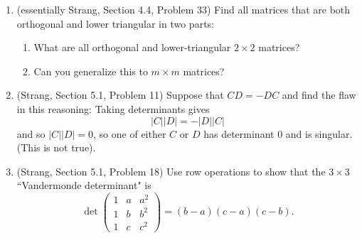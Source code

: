 \documentclass[11pt]{article}
\begin{document}
\begin{enumerate}
\pagebreak

\item (essentially Strang, Section 4.4, Problem 33) Find all matrices that are both orthogonal and lower triangular in two parts:
\begin{enumerate}
\item What are all orthogonal and lower-triangular $2\times 2$ matrices?
\item Can you generalize this to $m\times m$ matrices?
\end{enumerate}

\item (Strang, Section 5.1, Problem 11) Suppose that $CD = -DC$ and find the flaw in this reasoning: Taking determinants gives
\[ |C||D| = -|D||C| \]
and so $|C||D| = 0$, so one of either $C$ or $D$ has determinant $0$ and is singular.  (This is not true).


\item (Strang, Section 5.1, Problem 18) Use row operations to show that the $3 \times 3$ ``Vandermonde determinant" is
\[\det \begin{pmatrix} 1 & a & a^2 \\ 1 & b & b^2 \\ 1 & c & c^2 \end{pmatrix} = (b-a)(c-a)(c-b). \]



\end{enumerate}
\end{document}
